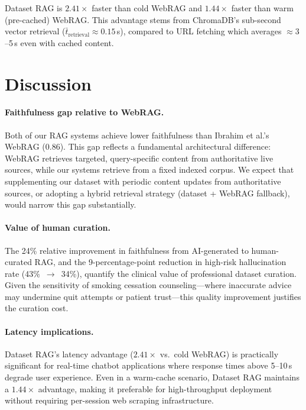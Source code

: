 \documentclass[11pt,a4paper]{article}
\begin{document}
Dataset RAG is $2.41\times$ faster than cold WebRAG and $1.44\times$ faster
than warm (pre-cached) WebRAG. This advantage stems from ChromaDB's
sub-second vector retrieval ($\bar{t}_\text{retrieval} \approx 0.15$\,s),
compared to URL fetching which averages $\approx 3$--5\,s even with cached content.

\section{Discussion}

\paragraph{Faithfulness gap relative to WebRAG.}
Both of our RAG systems achieve lower faithfulness than Ibrahim et al.'s
WebRAG ($0.86$).
This gap reflects a fundamental architectural difference: WebRAG retrieves
targeted, query-specific content from authoritative live sources, while our
systems retrieve from a fixed indexed corpus.
We expect that supplementing our dataset with periodic content updates
from authoritative sources, or adopting a hybrid retrieval strategy
(dataset + WebRAG fallback), would narrow this gap substantially.

\paragraph{Value of human curation.}
The 24\% relative improvement in faithfulness from AI-generated to human-curated
RAG, and the 9-percentage-point reduction in high-risk hallucination rate
(43\%~$\to$~34\%), quantify the clinical value of professional dataset curation.
Given the sensitivity of smoking cessation counseling—where inaccurate advice
may undermine quit attempts or patient trust—this quality improvement
justifies the curation cost.

\paragraph{Latency implications.}
Dataset RAG's latency advantage ($2.41\times$ vs.\ cold WebRAG) is
practically significant for real-time chatbot applications where
response times above 5--10\,s degrade user experience.
Even in a warm-cache scenario, Dataset RAG maintains a $1.44\times$ advantage,
making it preferable for high-throughput deployment without requiring
per-session web scraping infrastructure.
\end{document}
